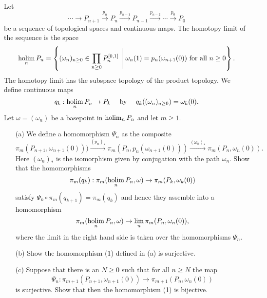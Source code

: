 \label{exercise:AT1Sheet8.1}
Let
\[
\cdots \to P_{n+1}
\xrightarrow{p_n} P_n
\xrightarrow{p_{n-1}} P_{n-1}
\xrightarrow{p_{n-2}} \cdots
\xrightarrow{p_0} P_0
\]
be a sequence of topological spaces and continuous maps. The homotopy limit of the
sequence is the space
\[
\holim_n P_n =
\left\{ (\omega_n)_{n\ge0} \in\prod_{n\ge0} P_n^{[0,1]}\ \Bigg|\ \omega_n(1) = p_n(\omega_{n+1}(0)) \text{ for all } n\ge0\right\}.
\]
The homotopy limit has the subspace topology of the product topology. We define continuous maps
\[
q_k : \operatorname*{holim}_n P_n \to P_k \quad\text{ by }\quad q_k((\omega_n)_{n\ge0}) = \omega_k(0).\]
Let $\omega = (\omega_n)$ be a basepoint in $\operatorname*{holim}_nP_n$ and let $m\ge1$.
\begin{enumerate}
    \item[(a)] We define a homomorphism $\Psi_n$ as the composite 
    \[
    \pi_m(P_{n+1},\omega_{n+1}(0))) \xrightarrow{(p_n)_*}
    \pi_m(P_n,p_n(\omega_{n+1}(0))) \xrightarrow{(\omega_n)_*} \pi_m(P_n,\omega_n(0)).
    \]
Here $(\omega_n)_*$ is the isomorphism given by conjugation with the path $\omega_n$. Show that
the homomorphisms
    \[
    \pi_m(q_k) : \pi_m(\operatorname*{holim}_nP_n,\omega) \to \pi_m(P_k,\omega_k(0))
    \]
satisfy $\Psi_k \circ \pi_m(q_{k+1}) = \pi_m(q_k)$
and hence they assemble into a homomorphism
\begin{equation}
\pi_m(\operatorname*{holim}_nP_n,\omega) \to \lim_n \pi_m(P_n,\omega_n(0)),
\end{equation}
where the limit in the right hand side is taken over the homomorphisms $\Psi_n$.
\item[(b)] Show the homomorphism (1) defined in (a) is surjective.
\item[(c)] Suppose that there is an $N\ge0$ such that for all $n\ge N$ the map
\[
\Psi_n : \pi_{m+1}(P_{n+1},\omega_{n+1}(0)) \to \pi_{m+1}(P_n,\omega_n(0))
\]
is surjective. Show that then the homomorphism (1) is bijective.
\end{enumerate}

\begin{sketch}
\end{sketch}

